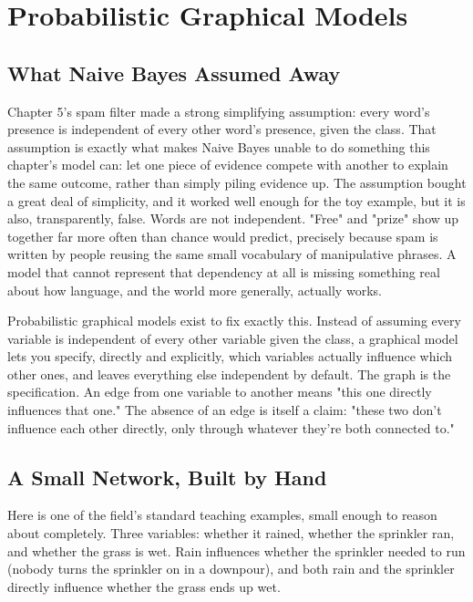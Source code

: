 \chapter{Probabilistic Graphical Models}

\section*{What Naive Bayes Assumed Away}

Chapter 5's spam filter made a strong simplifying assumption: every word's presence is independent of every other word's presence, given the class. That assumption is exactly what makes Naive Bayes unable to do something this chapter's model can: let one piece of evidence compete with another to explain the same outcome, rather than simply piling evidence up. The assumption bought a great deal of simplicity, and it worked well enough for the toy example, but it is also, transparently, false. Words are not independent. "Free" and "prize" show up together far more often than chance would predict, precisely because spam is written by people reusing the same small vocabulary of manipulative phrases. A model that cannot represent that dependency at all is missing something real about how language, and the world more generally, actually works.

Probabilistic graphical models exist to fix exactly this. Instead of assuming every variable is independent of every other variable given the class, a graphical model lets you specify, directly and explicitly, which variables actually influence which other ones, and leaves everything else independent by default. The graph is the specification. An edge from one variable to another means "this one directly influences that one." The absence of an edge is itself a claim: "these two don't influence each other directly, only through whatever they're both connected to."

\section*{A Small Network, Built by Hand}

Here is one of the field's standard teaching examples, small enough to reason about completely. Three variables: whether it rained, whether the sprinkler ran, and whether the grass is wet. Rain influences whether the sprinkler needed to run (nobody turns the sprinkler on in a downpour), and both rain and the sprinkler directly influence whether the grass ends up wet.

